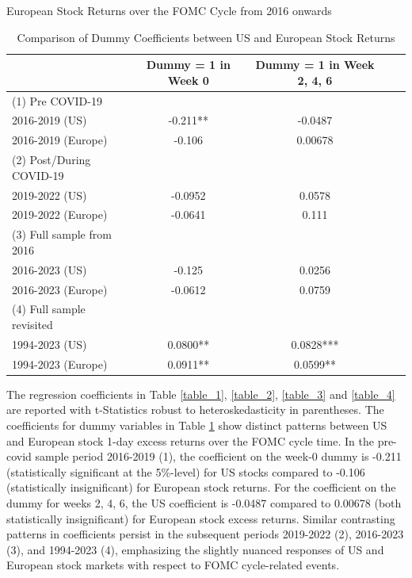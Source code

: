\begin{table}[h]
\begin{center}
\begin{adjustbox}{width=1\textwidth}

\end{tabular}
}
\end{adjustbox}
\caption{\label{table_4} European Stock Returns over the FOMC Cycle from 2016 onwards}
\end{center}
\end{table}

\begin{table}[h]
    \centering
    \caption{Comparison of Dummy Coefficients between US and European Stock Returns}
    \label{table:table_5}
    \begin{tabular}{l|cccc}
        \toprule
        & Dummy = 1 in Week 0 & Dummy = 1 in Week 2, 4, 6 \\
        \midrule
         (1) Pre COVID-19 &&\\
         2016-2019 (US) & -0.211** & -0.0487 \\
         2016-2019 (Europe) & -0.106 & 0.00678  \\
         \addlinespace
        (2) Post/During COVID-19&&\\
        2019-2022 (US) & -0.0952 & 0.0578 \\
        2019-2022 (Europe) & -0.0641 & 0.111 \\
            \addlinespace
        (3) Full sample from 2016&&\\
        2016-2023 (US) & -0.125 & 0.0256 \\
        2016-2023 (Europe) & -0.0612 & 0.0759 \\
          \addlinespace
        (4) Full sample revisited&&\\
        1994-2023 (US) & 0.0800** & 0.0828***  \\
        1994-2023 (Europe) & 0.0911**& 0.0599** \\
        \bottomrule
    \end{tabular}
\end{table}

The regression coefficients in Table \ref{table_1},  \ref{table_2},  \ref{table_3} and \ref{table_4} are reported with t-Statistics robust to heteroskedasticity in parentheses.
The coefficients for dummy variables in Table \ref{table:table_5} show distinct patterns between US and European stock 1-day excess returns over the FOMC cycle time.
In the pre-covid sample period 2016-2019 (1), the coefficient on the week-0 dummy is -0.211 (statistically significant at the 5\%-level) for US stocks compared to -0.106 (statistically insignificant) for European stock returns.
For the coefficient on the dummy for weeks 2, 4, 6, the US coefficient is -0.0487 compared to 0.00678 (both statistically insignificant) for European stock excess returns.  Similar contrasting patterns in coefficients persist in the subsequent periods 2019-2022 (2), 2016-2023 (3), and 1994-2023 (4), emphasizing the slightly nuanced responses of US and European stock markets with respect to FOMC cycle-related events.

